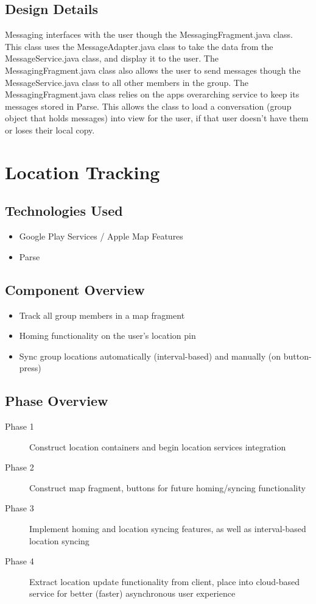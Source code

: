 \subsection{Design Details}
Messaging interfaces with the user though the MessagingFragment.java class. This class uses the MessageAdapter.java class to take the data from the MessageService.java class, and display it to the user. The MessagingFragment.java class also allows the user to send messages though the MessageService.java class to all other members in the group.
The MessagingFragment.java class relies on the apps overarching service to keep its messages stored in Parse. This allows the class to load a conversation (group object that holds messages) into view for the user, if that user doesn't have them or loses their local copy.

\section{Location Tracking }

\subsection{Technologies  Used}
\begin{itemize}
  \item Google Play Services / Apple Map Features
  \item Parse
\end{itemize}

\subsection{Component  Overview}
\begin{itemize}
  \item Track all group members in a map fragment
  \item Homing functionality on the user's location pin
  \item Sync group locations automatically (interval-based) and manually (on button-press)
\end{itemize}

\subsection{Phase Overview}
\begin{description}
  \item [Phase 1] Construct location containers and begin location services integration
  \item [Phase 2] Construct map fragment, buttons for future homing/syncing functionality
  \item [Phase 3] Implement homing and location syncing features, as well as interval-based location syncing
  \item [Phase 4] Extract location update functionality from client, place into cloud-based service for better (faster) asynchronous user experience
\end{description}

